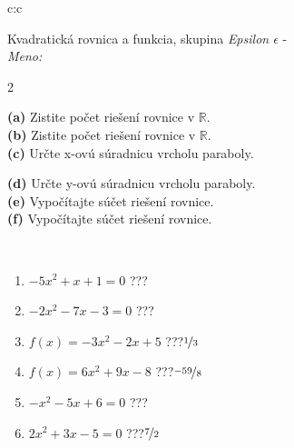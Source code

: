 \documentclass[10pt]{report}
\begin{document}
\begin{tabular}{c:c}
\begin{minipage}[c][104.5mm][t]{0.5\linewidth}
\begin{center}
\vspace{7mm}
{\huge {\LARGE Kvadratická rovnica a funkcia}, skupina \textit{Epsilon $\epsilon$} -}\\[5mm]
\textit{Meno:}\phantom{xxxxxxxxxxxxxxxxxxxxxxxxxxxxxxxxxxxxxxxxxxxxxxxxxxxxxxxxxxxxxxxxx}\\[5mm]
\begin{minipage}{0.95\linewidth}
\begin{center}
{\small \begin{multicols}{2} \raggedright
\textbf{(a)} Zistite počet riešení rovnice v \(\mathbb{R}\). \\[1mm]
\textbf{(b)} Zistite počet riešení rovnice v \(\mathbb{R}\). \\[1mm]
\textbf{(c)} Určte x-ovú súradnicu vrcholu paraboly. \par \columnbreak
\textbf{(d)} Určte y-ovú súradnicu vrcholu paraboly. \\[1mm]
\textbf{(e)} Vypočítajte súčet riešení rovnice. \\[1mm]
\textbf{(f)} Vypočítajte súčet riešení rovnice.
\end{multicols}
}
\end{center}
\end{minipage}
\\[4mm]
\begin{minipage}{0.79\linewidth}
\begin{center}
\begin{varwidth}{\linewidth}
\begin{enumerate}
\Large
\item $-5x^2+x+1=0$\quad \dotfill\; ???\;\dotfill {}
\item $-2x^2-7x-3=0$\quad \dotfill\; ???\;\dotfill {}
\item $f(x)=-3x^2-2x+5$\quad \dotfill\; ???\;\dotfill \quad $\nicefrac{1}{3}$
\item $f(x)=6x^2+9x-8$\quad \dotfill\; ???\;\dotfill \quad $\nicefrac{-59}{8}$
\item $-x^2-5x+6=0$\quad \dotfill\; ???\;\dotfill {}
\item $2x^2+3x-5=0$\quad \dotfill\; ???\;\dotfill \quad $\nicefrac{7}{2}$
\end{enumerate}
\end{varwidth}
\end{center}

\end{minipage}
\end{center}
\end{minipage}
\end{tabular}
\end{document}
